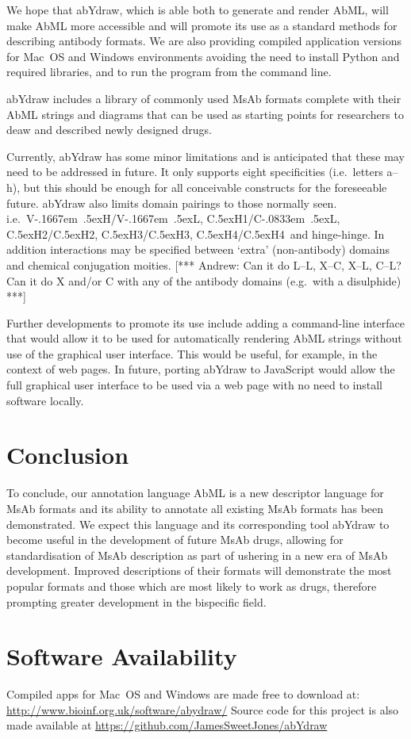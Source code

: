 \documentclass[a4]{article}
\newcommand{\VH}{\mbox{V\kern-.1667em \lower.5ex\hbox{\scriptsize H}}}
\newcommand{\VL}{\mbox{V\kern-.1667em \lower.5ex\hbox{\scriptsize L}}}
\newcommand{\VHVL}{\mbox{\VH/\VL}}
\newcommand{\CH}[1]{\mbox{C\lower.5ex\hbox{\scriptsize H}#1}}
\newcommand{\CL}{\mbox{C\kern-.0833em \lower.5ex\hbox{\scriptsize L}}}
\newcommand{\andrew}[1]{{\color{red} [*** Andrew: #1 ***]}}
\begin{document}
We hope that abYdraw, which is able both to generate and render AbML,
will make AbML more accessible and will promote its use as a standard
methods for describing antibody formats.  We are also providing
compiled application versions for Mac~OS and Windows environments
avoiding the need to install Python and required libraries, and to run
the program from the command line.

abYdraw includes a library of commonly used MsAb formats complete with their AbML
strings and diagrams that can be used as starting points for
researchers to deaw and described newly designed drugs.

Currently, abYdraw has some minor limitations and is anticipated that
these may need to be addressed in future. It only supports eight
specificities (i.e.\ letters a--h), but this should be enough for all
conceivable constructs for the foreseeable future.  abYdraw also
limits domain pairings to those normally seen. i.e.\ \VHVL,
\CH{1}/\CL, \CH{2}/\CH{2}, \CH{3}/\CH{3}, \CH{4}/\CH{4}\ and
hinge-hinge. In addition interactions may be specified between `extra'
(non-antibody) domains and chemical conjugation moities.  \andrew{Can
  it do L--L, X--C, X--L, C--L? Can it do X and/or C with any of the
  antibody domains (e.g.\ with a disulphide)}

Further developments to promote its use include adding a command-line
interface that would allow it to be used for automatically rendering
AbML strings without use of the graphical user interface. This would
be useful, for example, in the context of web pages. In future,
porting abYdraw to JavaScript would allow the full graphical user
interface to be used via a web page with no need to install software
locally.


\section{Conclusion}

To conclude, our annotation language AbML is a new descriptor language
for MsAb formats and its ability to annotate all existing MsAb formats
has been demonstrated. We expect this language and its corresponding
tool abYdraw to become useful in the development of future MsAb drugs,
allowing for standardisation of MsAb description as part of ushering
in a new era of MsAb development. Improved descriptions of their
formats will demonstrate the most popular formats and those which are
most likely to work as drugs, therefore prompting greater development
in the bispecific field.  

\section{Software Availability}
Compiled apps for Mac~OS and Windows are made free to download at:
\url{http://www.bioinf.org.uk/software/abydraw/}
Source code for this project is also made available at
\url{https://github.com/JamesSweetJones/abYdraw}

 
\end{document}

